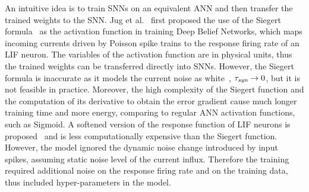 \documentclass{article}
\begin{document}
	An intuitive idea is to train SNNs on an equivalent ANN and then transfer the trained weights to the SNN.
	Jug et al.~\cite{Jug_etal_2012} first proposed the use of the Siegert formula~\cite{siegert1951first} as the activation function in training Deep Belief Networks, which maps incoming currents driven by Poisson spike trains to the response firing rate of an LIF neuron.
	The variables of the activation function are in physical units, thus the trained weights can be transferred directly into SNNs.
	However, the Siegert formula is inaccurate as it models the current noise as white~\cite{liu2016noisy}, $\tau_{\textit{\textrm{syn}}} \to 0$, but it is not feasible in practice.
	Moreover, the high complexity of the Siegert function and the computation of its derivative to obtain the error gradient cause much longer training time and more energy, comparing to regular ANN activation functions, such as Sigmoid.
	A softened version of the response function of LIF neurons is proposed~\cite{hunsberger2015spiking} and is less computationally expensive than the Siegert function.
	However, the model ignored the dynamic noise change introduced by input spikes, assuming static noise level of the current influx.
	Therefore the training required additional noise on the response firing rate and on the training data, thus included hyper-parameters in the model.
	
\end{document}
